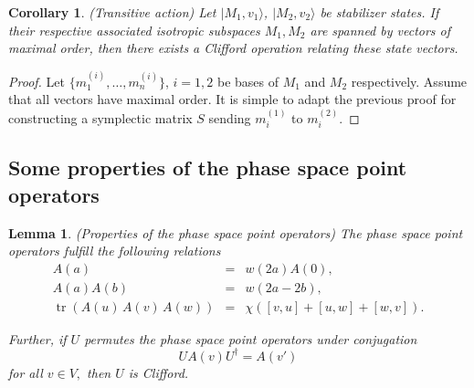 \documentclass[aps,twocolumn,floatfix]{revtex4}
\newtheorem{lemma}[theorem]{Lemma}
\newtheorem{corollary}[theorem]{Corollary}
\def\ket#1.{|#1\rangle}
\DeclareMathOperator{\tr}{tr}
\begin{document}
\begin{corollary}\label{corTransitive}
	\emph{(Transitive action)}
	Let $\ket M_1, v_1.$, $\ket M_2, v_2.$ be stabilizer states.
	If their respective associated isotropic subspaces $M_1, M_2$ are
	spanned by vectors of maximal order, then there exists a Clifford
	operation relating these state vectors.
\end{corollary}

\begin{proof}
	Let $\{m^{(i)}_1, \dots, m^{(i)}_n\}$, $i = 1,2$ be bases of $M_1$
	and $M_2$ respectively. Assume that all vectors have maximal order.
	It is simple to adapt the previous proof for constructing a
	symplectic matrix $S$ sending $m^{(1)}_i$ to $m^{(2)}_i$. 
\end{proof}


\subsection{Some properties of the phase space point operators}
\label{scMoyal}

\begin{lemma}
	\label{lmAProps}
	\emph{(Properties of the phase space point operators)}
	The phase space point operators fulfill the following relations
	\begin{eqnarray*}
		A(a)&=&w(2a)A(0),\\
		A(a)A(b)&=&w(2a-2b),\\
		\tr(A(u)\,A(v)\,A(w)) &=& \chi([v,u]+[u,w]+[w,v]).
	\end{eqnarray*}

	Further, if $U$ permutes the phase space point operators under
	conjugation
	\begin{equation*}
		U A(v) U^\dagger = A(v')
	\end{equation*}
	for all $v\in V,$ 
	then $U$ is Clifford.
\end{lemma}
\end{document}
